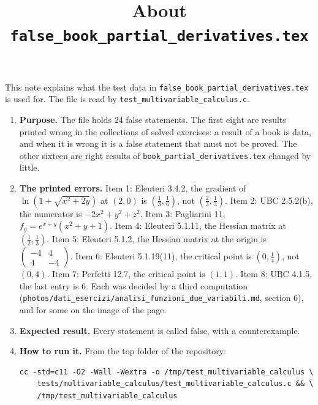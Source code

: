 \documentclass[11pt,a4paper]{article}
\title{About \texttt{false\_book\_partial\_derivatives.tex}}
\author{}
\date{}
\begin{document}
\maketitle
This note explains what the test data in \texttt{false\_book\_partial\_derivatives.tex} is used for. The file is read by \texttt{test\_multivariable\_calculus.c}.

\begin{enumerate}
\item \textbf{Purpose.} The file holds 24 false statements. The first eight are results printed wrong in the collections of solved exercises: a result of a book is data, and when it is wrong it is a false statement that must not be proved. The other sixteen are right results of \texttt{book\_partial\_derivatives.tex} changed by little.

\item \textbf{The printed errors.} Item 1: Eleuteri 3.4.2, the gradient of $\ln(1 + \sqrt{x^{2} + 2y})$ at $(2, 0)$ is $(\frac{1}{3}, \frac{1}{6})$, not $(\frac{2}{3}, \frac{1}{3})$. Item 2: UBC 2.5.2(b), the numerator is $-2x^{2} + y^{2} + z^{2}$. Item 3: Pagliarini 11, $f_{y} = e^{x + y}(x^{2} + y + 1)$. Item 4: Eleuteri 5.1.11, the Hessian matrix at $(\frac{1}{2}, \frac{1}{3})$. Item 5: Eleuteri 5.1.2, the Hessian matrix at the origin is $\begin{pmatrix} -4 & 4 \\ 4 & -4 \end{pmatrix}$. Item 6: Eleuteri 5.1.19(11), the critical point is $(0, \frac{1}{4})$, not $(0, 4)$. Item 7: Perfetti 12.7, the critical point is $(1, 1)$. Item 8: UBC 4.1.5, the last entry is $6$. Each was decided by a third computation (\texttt{photos/dati\_esercizi/analisi\_funzioni\_due\_variabili.md}, section 6), and for some on the image of the page.

\item \textbf{Expected result.} Every statement is called false, with a counterexample.

\item \textbf{How to run it.} From the top folder of the repository:
\begin{verbatim}
cc -std=c11 -O2 -Wall -Wextra -o /tmp/test_multivariable_calculus \
    tests/multivariable_calculus/test_multivariable_calculus.c && \
    /tmp/test_multivariable_calculus
\end{verbatim}
\end{enumerate}
\end{document}
